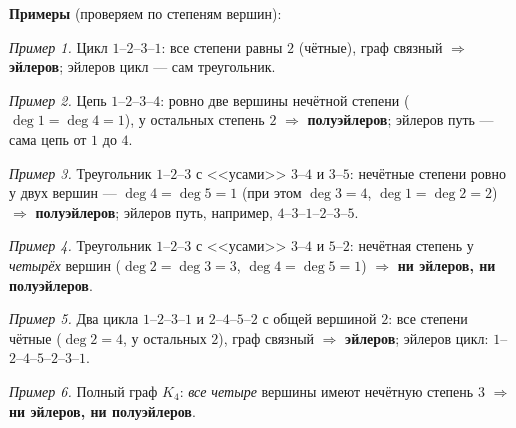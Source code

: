 \medskip
\noindent\textbf{Примеры} (проверяем по степеням вершин):

\noindent\textit{Пример 1.} Цикл $1$--$2$--$3$--$1$: все степени равны $2$
(чётные), граф связный $\Rightarrow$ \textbf{эйлеров}; эйлеров цикл --- сам
треугольник.

\noindent\textit{Пример 2.} Цепь $1$--$2$--$3$--$4$: ровно две вершины
нечётной степени ($\deg 1 = \deg 4 = 1$), у остальных степень $2$
$\Rightarrow$ \textbf{полуэйлеров}; эйлеров путь --- сама цепь от $1$ до $4$.

\noindent\textit{Пример 3.} Треугольник $1$--$2$--$3$ с <<усами>> $3$--$4$ и
$3$--$5$: нечётные степени ровно у двух вершин --- $\deg 4 = \deg 5 = 1$
(при этом $\deg 3 = 4$, $\deg 1 = \deg 2 = 2$) $\Rightarrow$
\textbf{полуэйлеров}; эйлеров путь, например, $4$--$3$--$1$--$2$--$3$--$5$.

\noindent\textit{Пример 4.} Треугольник $1$--$2$--$3$ с <<усами>> $3$--$4$ и
$5$--$2$: нечётная степень у \emph{четырёх} вершин
($\deg 2 = \deg 3 = 3$, $\deg 4 = \deg 5 = 1$) $\Rightarrow$
\textbf{ни эйлеров, ни полуэйлеров}.

\noindent\textit{Пример 5.} Два цикла $1$--$2$--$3$--$1$ и
$2$--$4$--$5$--$2$ с общей вершиной $2$: все степени чётные
($\deg 2 = 4$, у остальных $2$), граф связный $\Rightarrow$
\textbf{эйлеров}; эйлеров цикл: $1$--$2$--$4$--$5$--$2$--$3$--$1$.

\noindent\textit{Пример 6.} Полный граф $K_4$: \emph{все четыре} вершины
имеют нечётную степень $3$ $\Rightarrow$ \textbf{ни эйлеров, ни
полуэйлеров}.

